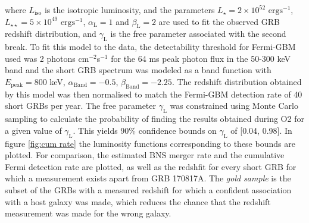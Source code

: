 \documentclass[11pt]{cuthesis}
\begin{document}
where $L_\text{iso}$ is the isotropic luminosity, and the parameters $L_{\star} = 2 \times 10^{52} \text{ ergs}^{-1}$, $L_{\star\star}=5 \times 10^{49} \text{ ergs}^{-1}$, $\alpha_\text{L} = 1$ and $\beta_\text{L} = 2$ are used to fit the observed GRB redshift distribution, and $\gamma_\text{L}$ is the free parameter associated with the second break. To fit this model to the data, the detectability threshold for Fermi-GBM used was 2 photons cm$^{-2}$s$^{-1}$ for the 64 ms peak photon flux in the 50-300 keV band and the short GRB spectrum was modeled as a band function with $E_\text{peak}=800$ keV, $\alpha_\text{Band}=-0.5$, $\beta_\text{Band} = -2.25$. The redshift distribution obtained by this model was then normalised to match the Fermi-GBM detection rate of 40 short GRBs per year. The free parameter $\gamma_\text{L}$ was constrained using Monte Carlo sampling to calculate the probability of finding the results obtained during O2 for a given value of $\gamma_\text{L}$. This yields 90\% confidence bounds on $\gamma_\text{L}$ of [0.04, 0.98]. In figure \ref{fig:cum rate} the luminosity functions corresponding to these bounds are plotted. For comparison, the estimated BNS merger rate \cite{GW170817_GRB} and the cumulative Fermi detection rate \cite{Howell} are plotted, as well as the redshfit for every short GRB for which a measurement exists apart from GRB 170817A. The \textit{gold sample} is the subset of the GRBs with a measured redshift for which a confident association with a host galaxy was made, which reduces the chance that the redshift measurement was made for the wrong galaxy.
\end{document}

